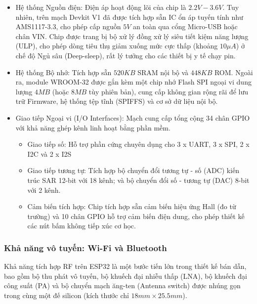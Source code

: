\documentclass[12pt, a4paper, oneside]{article}
\begin{document}
\begin{itemize}
    \item Hệ thống Nguồn điện: Điện áp hoạt động lõi của chip là $2.2V - 3.6V$. Tuy nhiên, trên mạch Devkit V1 đã được tích hợp sẵn IC ổn áp tuyến tính như AMS1117-3.3, cho phép cấp nguồn $5V$ an toàn qua cổng Micro-USB hoặc chân VIN. Chip được trang bị bộ xử lý đồng xử lý siêu tiết kiệm năng lượng (ULP), cho phép dòng tiêu thụ giảm xuống mức cực thấp (khoảng $10 \mu A$) ở chế độ Ngủ sâu (Deep-sleep), rất lý tưởng cho các thiết bị y tế chạy pin.
    \item Hệ thống Bộ nhớ: Tích hợp sẵn $520 KB$ SRAM nội bộ và $448 KB$ ROM. Ngoài ra, module WROOM-32 được gắn kèm một chip nhớ Flash SPI ngoại vi dung lượng $4MB$ (hoặc $8MB$ tùy phiên bản), cung cấp không gian rộng rãi để lưu trữ Firmware, hệ thống tệp tĩnh (SPIFFS) và cơ sở dữ liệu nội bộ.
    \item Giao tiếp Ngoại vi (I/O Interfaces): Mạch cung cấp tổng cộng 34 chân GPIO với khả năng ghép kênh linh hoạt bằng phần mềm.
    \begin{itemize}
        \item Giao tiếp số: Hỗ trợ phần cứng chuyên dụng cho 3 x UART, 3 x SPI, 2 x I2C và 2 x I2S
        \item Giao tiếp tương tự: Tích hợp bộ chuyển đổi tương tự - số (ADC) kiến trúc SAR 12-bit với 18 kênh; và bộ chuyển đổi số - tương tự (DAC) 8-bit với 2 kênh.
        \item Cảm biến tích hợp: Chip tích hợp sẵn cảm biến hiệu ứng Hall (đo từ trường) và 10 chân GPIO hỗ trợ cảm biến điện dung, cho phép thiết kế các nút bấm không tiếp xúc cơ học.
    \end{itemize}
\end{itemize}
\subsubsection{Khả năng vô tuyến: Wi-Fi và Bluetooth}
Khả năng tích hợp RF trên ESP32 là một bước tiến lớn trong thiết kế bán dẫn, bao gồm bộ thu phát vô tuyến, bộ khuếch đại nhiễu thấp (LNA), bộ khuếch đại công suất (PA) và bộ chuyển mạch ăng-ten (Antenna switch) được nhúng gọn trong cùng một đế silicon (kích thước chỉ $18mm \times 25.5mm$).
\end{document}
